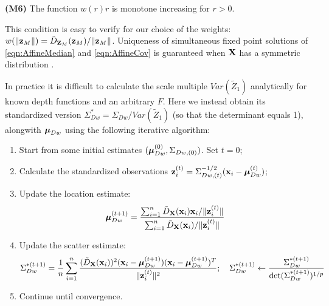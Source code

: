 \documentclass[12pt,letterpaper]{article}
\theoremstyle{definition} \newtheorem{Definition}[Theorem]{Definition}
\begin{document}
\vspace{1em}
\noindent\textbf{(M6)} The function $w(r)r$ is monotone increasing for $r>0$.

\vspace{1em}
\noindent This condition is easy to verify for our choice of the weights: $w(\| {\bf{z}}_M \| ) = \tilde D_{{\mathbf{Z}}_M} ({\bf{z}}_M) / \| {\bf{z}}_M \|$. Uniqueness of simultaneous fixed point solutions of \ref{eqn:AffineMedian} and \ref{eqn:AffineCov} is guaranteed when ${\mathbf{X}}$ has a symmetric distribution \citep{HuberBook81}.

In practice it is difficult to calculate the scale multiple $Var (\tilde Z_1)$ analytically for known depth functions and an arbitrary $F$. Here we instead obtain its standardized version $\Sigma_{Dw}^* = \Sigma_{Dw} / Var(\tilde Z_1)$ (so that the determinant equals 1), alongwith ${\boldsymbol{\mu}}_{Dw}$ using the following iterative algorithm:

\begin{enumerate}
\item Start from some initial estimates $({\boldsymbol{\mu}}_{Dw}^{(0)}, \Sigma_{Dw,(0)})$. Set $t=0$;

\item Calculate the standardized observations ${\bf{z}}_i^{(t)} = \Sigma_{Dw,(t)}^{-1/2} ({\bf{x}}_i - {\boldsymbol{\mu}}_{Dw}^{(t)})$;

\item Update the location estimate:
%
$$
{\boldsymbol{\mu}}_{Dw}^{(t+1)} = \frac{\sum_{i=1}^n \tilde D_{\mathbf{X}} ({\bf{x}}_i) {\bf{x}}_i / \| {\bf{z}}_i^{(t)} \| }{\sum_{i=1}^n \tilde D_{\mathbf{X}} ({\bf{x}}_i) / \| {\bf{z}}_i^{(t)} \|}
$$
%
\item Update the scatter estimate:
%
$$
\Sigma_{Dw}^{*(t+1)} = \frac{1}{n} \sum_{i=1}^n \frac{(\tilde D_{\mathbf{X}} ({\bf{x}}_i))^2 ({\bf{x}}_i - {\boldsymbol{\mu}}_{Dw}^{(t+1)})({\bf{x}}_i - {\boldsymbol{\mu}}_{Dw}^{(t+1)})^T}{\| {\bf{z}}_i^{(t)} \|^2}; \quad \Sigma_{Dw}^{*(t+1)} \leftarrow \frac{\Sigma_{Dw}^{*(t+1)}}{\text{det} (\Sigma_{Dw}^{*(t+1)})^{1/p}}
$$
%
\item Continue until convergence.
\end{enumerate}
\end{document}
